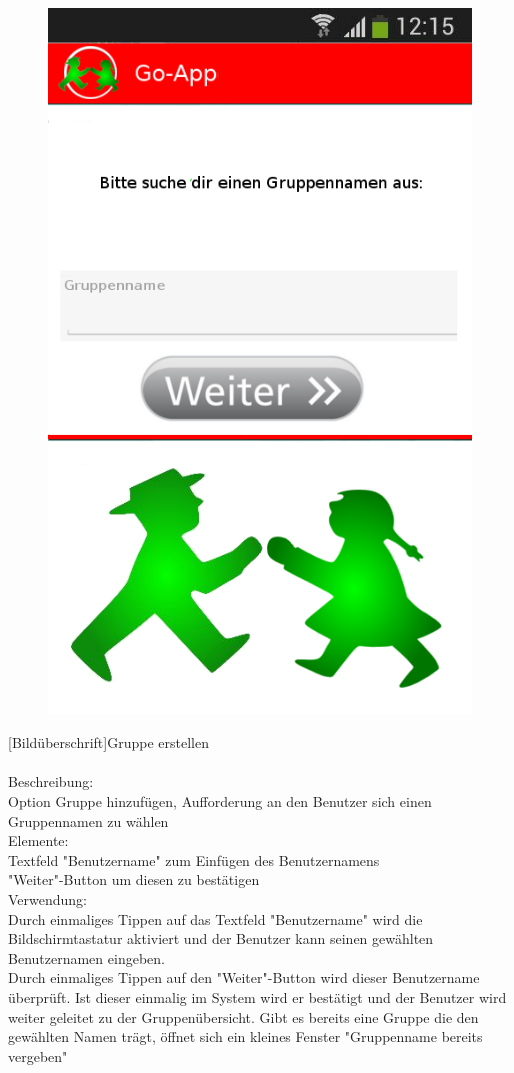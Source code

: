 \begin{figure}
	\includegraphics[scale =1]{resources/images/gruppe_erstellen.png}
\end{figure}
[Bildüberschrift]Gruppe erstellen\\ \\
[Kleinüberschrift]Beschreibung:\\
Option Gruppe hinzufügen, Aufforderung an den Benutzer sich einen Gruppennamen zu wählen\\
[Kleinüberschrift]Elemente:\\
Textfeld "Benutzername" zum Einfügen des Benutzernamens\\
"Weiter"-Button um diesen zu bestätigen\\
[Kleinüberschrift]Verwendung:\\
Durch einmaliges Tippen auf das Textfeld "Benutzername" wird die Bildschirmtastatur aktiviert und der Benutzer kann seinen gewählten Benutzernamen eingeben.\\
Durch einmaliges Tippen auf den "Weiter"-Button wird dieser Benutzername überprüft. Ist dieser einmalig im System wird er bestätigt und der Benutzer wird weiter geleitet zu der Gruppenübersicht. Gibt es bereits eine Gruppe die den gewählten Namen trägt, öffnet sich ein kleines Fenster "Gruppenname bereits vergeben"\\ \\

